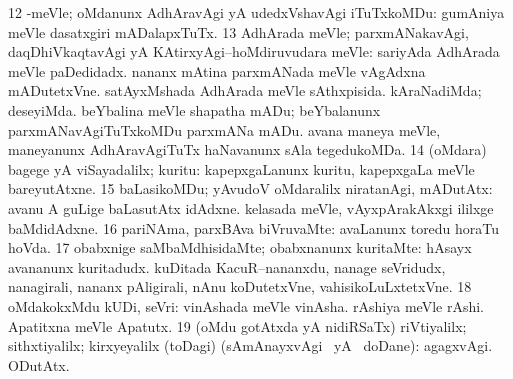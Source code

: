 \num{12} -meVle; oMdanunx AdhAravAgi yA udedxVshavAgi iTuTxkoMDu:  gumAniya meVle dasatxgiri mADalapxTuTx. 
\num{13} AdhArada meVle; parxmANakavAgi, daqDhiVkaqtavAgi yA KAtirxyAgi--hoMdiruvudara meVle:  sariyAda AdhArada meVle paDedidadx.  nananx mAtina parxmANada meVle vAgAdxna mADutetxVne.  satAyxMshada AdhArada meVle sAthxpisida.  kAraNadiMda; deseyiMda.  beYbalina meVle shapatha mADu; beYbalanunx parxmANavAgiTuTxkoMDu parxmANa mADu.  avana maneya meVle, maneyanunx AdhAravAgiTuTx haNavanunx sAla tegedukoMDa. 
\num{14} (oMdara) bagege yA viSayadalilx; kuritu:  kapepxgaLanunx kuritu, kapepxgaLa meVle bareyutAtxne. 
\num{15} baLasikoMDu; yAvudoV oMdaralilx niratanAgi, mADutAtx:  avanu A guLige baLasutAtx idAdxne.  kelasada meVle, vAyxpArakAkxgi ililxge baMdidAdxne. 
\num{16} pariNAma, parxBAva biVruvaMte:  avaLanunx toredu horaTu hoVda. 
\num{17} obabxnige saMbaMdhisidaMte; obabxnanunx kuritaMte:  hAsayx avananunx kuritadudx.  kuDitada KacuR--nananxdu, nanage seVridudx, nanagirali, nananx pAligirali, nAnu koDutetxVne, vahisikoLuLxtetxVne. 
\num{18} oMdakokxMdu kUDi, seVri:  vinAshada meVle vinAsha.  rAshiya meVle rAshi.  Apatitxna meVle Apatutx. 
\num{19} (oMdu gotAtxda yA nidiRSaTx) riVtiyalilx; sithxtiyalilx; kirxyeyalilx (toDagi) (sAmAnayxvAgi  \eng{$+$} \gu\ yA \nA\ doDane):  agagxvAgi.  ODutAtx. 
\enum
\emng

